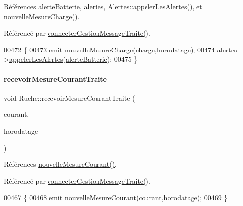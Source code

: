 Références \hyperlink{parametres_8h_a83a725fd153179a2bd97afcc8307737ba11c71364df2afd149875ebfe0238ef7e}{alerte\+Batterie}, \hyperlink{class_ruche_af07644ddce44cb5ed4286475dc0f9d46}{alertes}, \hyperlink{class_alertes_ad04a02dcc6e6f14da0784c7054888b05}{Alertes\+::appeler\+Les\+Alertes()}, et \hyperlink{class_ruche_a49ac0c627ecac39c969403db1495711f}{nouvelle\+Mesure\+Charge()}.



Référencé par \hyperlink{class_ruche_a20ec8c6dc931218e5cf682050fe845d9}{connecter\+Gestion\+Message\+Traite()}.


\begin{DoxyCode}
00472 \{
00473     emit \hyperlink{class_ruche_a49ac0c627ecac39c969403db1495711f}{nouvelleMesureCharge}(charge,horodatage);
00474     \hyperlink{class_ruche_af07644ddce44cb5ed4286475dc0f9d46}{alertes}->\hyperlink{class_alertes_ad04a02dcc6e6f14da0784c7054888b05}{appelerLesAlertes}(\hyperlink{parametres_8h_a83a725fd153179a2bd97afcc8307737ba11c71364df2afd149875ebfe0238ef7e}{alerteBatterie});
00475 \}
\end{DoxyCode}
\mbox{\label{class_ruche_a9e416457e8712d353580b7b242ef0836}} 
\paragraph{\texorpdfstring{recevoir\+Mesure\+Courant\+Traite}{recevoirMesureCourantTraite}}
{\footnotesize\ttfamily void Ruche\+::recevoir\+Mesure\+Courant\+Traite (\begin{DoxyParamCaption}\item[{double}]{courant,  }\item[{Q\+String}]{horodatage }\end{DoxyParamCaption})\hspace{0.3cm}{\ttfamily [slot]}}



Références \hyperlink{class_ruche_a46d8191444302b02a52d1128c5650730}{nouvelle\+Mesure\+Courant()}.



Référencé par \hyperlink{class_ruche_a20ec8c6dc931218e5cf682050fe845d9}{connecter\+Gestion\+Message\+Traite()}.


\begin{DoxyCode}
00467 \{
00468     emit \hyperlink{class_ruche_a46d8191444302b02a52d1128c5650730}{nouvelleMesureCourant}(courant,horodatage);
00469 \}
\end{DoxyCode}
\mbox{\label{class_ruche_a2d19d8438eae55c1d76691398087f079}} 

